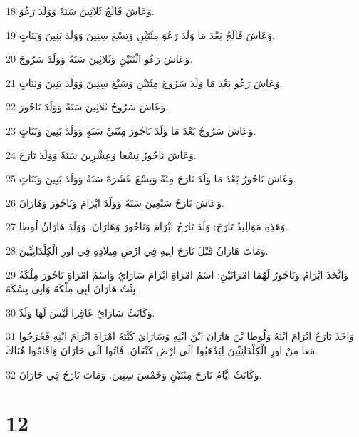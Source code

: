 \par 18 وَعَاشَ فَالَجُ ثَلاثِينَ سَنَةً وَوَلَدَ رَعُوَ.
\par 19 وَعَاشَ فَالَجُ بَعْدَ مَا وَلَدَ رَعُوَ مِئَتَيْنِ وَتِسْعَ سِنِينَ وَوَلَدَ بَنِينَ وَبَنَاتٍ.
\par 20 وَعَاشَ رَعُو اثْنَتَيْنِ وَثَلاثِينَ سَنَةً وَوَلَدَ سَرُوجَ.
\par 21 وَعَاشَ رَعُو بَعْدَ مَا وَلَدَ سَرُوجَ مِئَتَيْنِ وَسَبْعَ سِنِينَ وَوَلَدَ بَنِينَ وَبَنَاتٍ.
\par 22 وَعَاشَ سَرُوجُ ثَلاثِينَ سَنَةً وَوَلَدَ نَاحُورَ.
\par 23 وَعَاشَ سَرُوجُ بَعْدَ مَا وَلَدَ نَاحُورَ مِئَتَيْ سَنَةٍ وَوَلَدَ بَنِينَ وَبَنَاتٍ.
\par 24 وَعَاشَ نَاحُورُ تِسْعا وَعِشْرِينَ سَنَةً وَوَلَدَ تَارَحَ.
\par 25 وَعَاشَ نَاحُورُ بَعْدَ مَا وَلَدَ تَارَحَ مِئَةً وَتِسْعَ عَشَرَةَ سَنَةً وَوَلَدَ بَنِينَ وَبَنَاتٍ.
\par 26 وَعَاشَ تَارَحُ سَبْعِينَ سَنَةً وَوَلَدَ ابْرَامَ وَنَاحُورَ وَهَارَانَ.
\par 27 وَهَذِهِ مَوَالِيدُ تَارَحَ: وَلَدَ تَارَحُ ابْرَامَ وَنَاحُورَ وَهَارَانَ. وَوَلَدَ هَارَانُ لُوطا.
\par 28 وَمَاتَ هَارَانُ قَبْلَ تَارَحَ ابِيهِ فِي ارْضِ مِيلادِهِ فِي اورِ الْكِلْدَانِيِّينَ.
\par 29 وَاتَّخَذَ ابْرَامُ وَنَاحُورُ لَهُمَا امْرَاتَيْنِ: اسْمُ امْرَاةِ ابْرَامَ سَارَايُ وَاسْمُ امْرَاةِ نَاحُورَ مِلْكَةُ بِنْتُ هَارَانَ ابِي مِلْكَةَ وَابِي يِسْكَةَ.
\par 30 وَكَانَتْ سَارَايُ عَاقِرا لَيْسَ لَهَا وَلَدٌ.
\par 31 وَاخَذَ تَارَحُ ابْرَامَ ابْنَهُ وَلُوطا بْنَ هَارَانَ ابْنَ ابْنِهِ وَسَارَايَ كَنَّتَهُ امْرَاةَ ابْرَامَ ابْنِهِ فَخَرَجُوا مَعا مِنْ اورِ الْكِلْدَانِيِّينَ لِيَذْهَبُوا الَى ارْضِ كَنْعَانَ. فَاتُوا الَى حَارَانَ وَاقَامُوا هُنَاكَ.
\par 32 وَكَانَتْ ايَّامُ تَارَحَ مِئَتَيْنِ وَخَمْسَ سِنِينَ. وَمَاتَ تَارَحُ فِي حَارَانَ.

\chapter{12}

